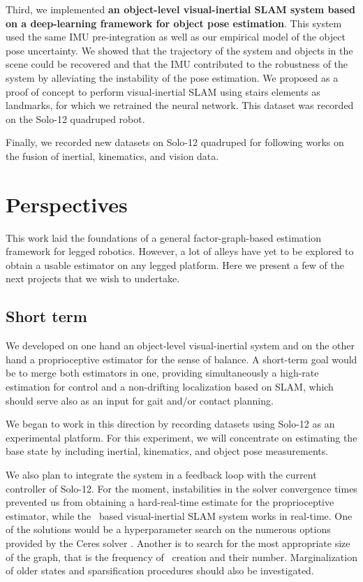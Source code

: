 Third, we implemented \textbf{an object-level visual-inertial SLAM system based on a deep-learning framework for object pose estimation}. This system  used the same 
IMU pre-integration as well as our empirical model of the object pose uncertainty. We showed that the trajectory of the system and objects
in the scene could be recovered and that the IMU contributed to the robustness of the system by alleviating the instability of the pose estimation. We proposed
as a proof of concept to perform visual-inertial SLAM using stairs elements as landmarks, for which we retrained the neural network. This dataset was recorded on the Solo-12 quadruped robot.

Finally, we recorded new datasets on Solo-12 quadruped for following works on the fusion of inertial, kinematics, and vision data. 

\section{Perspectives}
This work laid the foundations of a general factor-graph-based estimation framework for legged robotics. However, a lot of alleys have yet to be explored 
to obtain a usable estimator on any legged platform. Here we present a few of the next projects that we wish to undertake.

\subsection{Short term}
We developed on one hand an object-level visual-inertial system and on the other hand a proprioceptive estimator for the sense of balance. A short-term goal
would be to merge both estimators in one, providing simultaneously a high-rate estimation for control and a non-drifting localization based on SLAM, which should serve also as an input for gait and/or contact planning. 

We began to work in this direction by recording datasets using Solo-12 as an experimental platform. For this experiment, we will concentrate on estimating the 
base state by including inertial, kinematics, and object pose measurements. 

We also plan to integrate the system in a feedback loop with the current controller of Solo-12. For the moment, instabilities in the solver convergence times prevented
us from obtaining a hard-real-time estimate for the proprioceptive estimator, while the \apriltag\ based visual-inertial SLAM system works in real-time. One of the solutions would 
be a hyperparameter search on the numerous options provided by the Ceres solver \cite{ceres-solver}. Another is to search for the most appropriate size of the graph,
that is the frequency of \keyframe\ creation and their number. Marginalization of older states and sparsification procedures should also be investigated.



